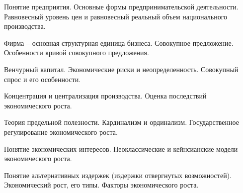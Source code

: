 \newpage


\shapkFull
\setcounter{zad}{0}

\z 	Понятие предприятия. Основные формы предпринимательской деятельности.
 \medskip
\z 	Равновесный уровень цен и равновесный реальный объем национального производства.
 \medskip

\newpage


\shapkFull
\setcounter{zad}{0}

\z 	Фирма – основная структурная единица бизнеса.
 \medskip
\z 	Совокупное предложение. Особенности кривой совокупного предложения.
 \medskip

\newpage


\shapkFull
\setcounter{zad}{0}

\z 	Венчурный капитал. Экономические риски и неопределенность.
 \medskip
\z 	Совокупный спрос и его особенности.
 \medskip

\newpage


\shapkFull
\setcounter{zad}{0}

\z 	Концентрация и централизация производства.
 \medskip
\z 	Оценка последствий экономического роста.
 \medskip

\newpage


\shapkFull
\setcounter{zad}{0}

\z 	Теория предельной полезности.  Кардинализм и ординализм.
 \medskip
\z 	Государственное регулирование экономического роста.
 \medskip

\newpage


\shapkFull
\setcounter{zad}{0}

\z 	Понятие экономических интересов.
 \medskip
\z 	Неоклассические и кейнсианские модели экономического роста.
 \medskip

\newpage


\shapkFull
\setcounter{zad}{0}

\z 	Понятие альтернативных издержек (издержки отвергнутых возможностей).
 \medskip
\z 	Экономический рост, его типы.  Факторы экономического роста.
 \medskip

\newpage


\shapkFull
\setcounter{zad}{0}

